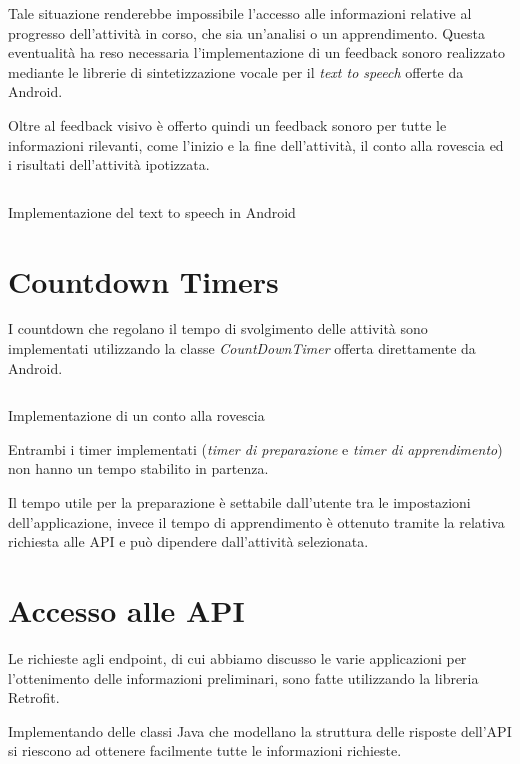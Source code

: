 Tale situazione renderebbe impossibile l'accesso alle informazioni relative al progresso dell'attività in corso, che sia 
un'analisi o un apprendimento.
Questa eventualità ha reso necessaria l'implementazione di un feedback sonoro realizzato mediante le librerie 
di sintetizzazione vocale per il \textit{text to speech} \cite{tts} offerte da Android.

Oltre al feedback visivo è offerto quindi un feedback sonoro per tutte le informazioni rilevanti, come l'inizio e la fine dell'attività, 
il conto alla rovescia ed i risultati dell'attività ipotizzata.

\vfill
\begin{listing}[H] 
    \inputminted[frame=single,framesep=10pt]{java}{assets/snippets/app/voice.java}
    \caption{Implementazione del text to speech in Android}
\end{listing}



\section{Countdown Timers}
I countdown che regolano il tempo di svolgimento delle attività sono implementati utilizzando la 
classe \textit{CountDownTimer} \cite{countdown} offerta direttamente da Android.
\begin{listing}[H] 
    \inputminted[frame=single,framesep=10pt]{java}{assets/snippets/app/countdown.java}
    \caption{Implementazione di un conto alla rovescia}
\end{listing}
\noindent Entrambi i timer implementati (\textit{timer di preparazione} e \textit{timer di apprendimento}) non hanno un tempo stabilito in partenza. 

Il tempo utile per la preparazione è settabile dall'utente tra le impostazioni dell'applicazione, invece il tempo di 
apprendimento è ottenuto tramite la relativa richiesta alle API e può dipendere dall'attività selezionata.



\section{Accesso alle API}
Le richieste agli endpoint, di cui abbiamo discusso le varie applicazioni per l'ottenimento delle informazioni preliminari, 
sono fatte utilizzando la libreria Retrofit. 

Implementando delle classi Java che modellano la struttura delle risposte dell'API si riescono ad ottenere facilmente 
tutte le informazioni richieste.

